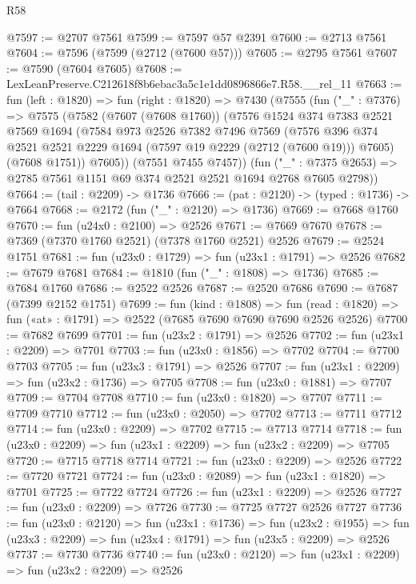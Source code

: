 \begin{lexlean}{R58}
\begin{coremodule}
@7597 := @2707 @7561
@7599 := @7597 @57 @2391
@7600 := @2713 @7561
@7604 := @7596 (@7599 (@2712 (@7600 @57)))
@7605 := @2795 @7561
@7607 := @7590 (@7604 @7605)
@7608 := LexLeanPreserve.C212618f8b6ebac3a5c1e1dd0896866e7.R58.__rel_11
@7663 := fun (left : @1820) =>
  fun (right : @1820) =>
  @7430
    (@7555
      (fun ("_" : @7376) =>
      @7575
        (@7582
          (@7607 (@7608 @1760))
          (@7576
            @1524
            @374
            @7383
            @2521
            @7569
            @1694
            (@7584
              @973
              @2526
              @7382
              @7496
              @7569
              (@7576 @396 @374 @2521 @2521 @2229 @1694 (@7597 @19 @2229 (@2712 (@7600 @19))) @7605)
              (@7608 @1751))
            @7605))
        (@7551 @7455 @7457))
      (fun ("_" : @7375 @2653) => @2785 @7561 @1151 @69 @374 @2521 @2521 @1694 @2768 @7605 @2798))
@7664 := (tail : @2209) -> @1736
@7666 := (pat : @2120) -> (typed : @1736) -> @7664
@7668 := @2172 (fun ("_" : @2120) => @1736)
@7669 := @7668 @1760
@7670 := fun (u24x0 : @2100) => @2526
@7671 := @7669 @7670
@7678 := @7369 (@7370 @1760 @2521) (@7378 @1760 @2521) @2526
@7679 := @2524 @1751
@7681 := fun (u23x0 : @1729) => fun (u23x1 : @1791) => @2526
@7682 := @7679 @7681
@7684 := @1810 (fun ("_" : @1808) => @1736)
@7685 := @7684 @1760
@7686 := @2522 @2526
@7687 := @2520 @7686
@7690 := @7687 (@7399 @2152 @1751)
@7699 := fun (kind : @1808) =>
  fun (read : @1820) => fun («at» : @1791) => @2522 (@7685 @7690 @7690 @7690 @2526 @2526)
@7700 := @7682 @7699
@7701 := fun (u23x2 : @1791) => @2526
@7702 := fun (u23x1 : @2209) => @7701
@7703 := fun (u23x0 : @1856) => @7702
@7704 := @7700 @7703
@7705 := fun (u23x3 : @1791) => @2526
@7707 := fun (u23x1 : @2209) => fun (u23x2 : @1736) => @7705
@7708 := fun (u23x0 : @1881) => @7707
@7709 := @7704 @7708
@7710 := fun (u23x0 : @1820) => @7707
@7711 := @7709 @7710
@7712 := fun (u23x0 : @2050) => @7702
@7713 := @7711 @7712
@7714 := fun (u23x0 : @2209) => @7702
@7715 := @7713 @7714
@7718 := fun (u23x0 : @2209) => fun (u23x1 : @2209) => fun (u23x2 : @2209) => @7705
@7720 := @7715 @7718 @7714
@7721 := fun (u23x0 : @2209) => @2526
@7722 := @7720 @7721
@7724 := fun (u23x0 : @2089) => fun (u23x1 : @1820) => @7701
@7725 := @7722 @7724
@7726 := fun (u23x1 : @2209) => @2526
@7727 := fun (u23x0 : @2209) => @7726
@7730 := @7725 @7727 @2526 @7727
@7736 := fun (u23x0 : @2120) =>
  fun (u23x1 : @1736) =>
  fun (u23x2 : @1955) => fun (u23x3 : @2209) => fun (u23x4 : @1791) => fun (u23x5 : @2209) => @2526
@7737 := @7730 @7736
@7740 := fun (u23x0 : @2120) => fun (u23x1 : @2209) => fun (u23x2 : @2209) => @2526

\end{coremodule}
\end{lexlean}
